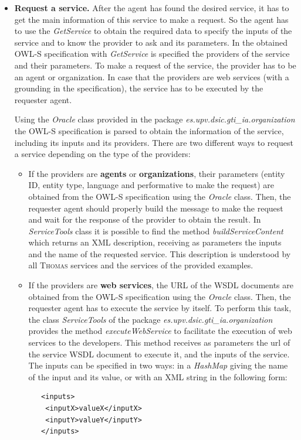 \begin{itemize}
\item \textbf{Request a service.} After the agent has found the desired service, it has to get the main information of this service to make a request. So the agent has to use the \textit{GetService} to obtain the required data to specify the inputs of the service and to know the provider to ask and its parameters. In the obtained OWL-S specification with \textit{GetService} is specified the providers of the service and their parameters. To make a request of the service, the provider has to be an agent or organization. In case that the providers are web services (with a grounding in the specification), the service has to be executed by the requester agent.

Using the \textit{Oracle} class provided in the package \textit{es.upv.dsic.gti\_ia.organization} the OWL-S specification is parsed to obtain the information of the service, including its inputs and its providers. There are two different ways to request a service depending on the type of the providers:
\begin{itemize}
 \item If the providers are \textbf{agents} or \textbf{organizations}, their parameters (entity ID, entity type, language and performative to make the request) are obtained from the OWL-S specification using the \textit{Oracle} class. Then, the requester agent should properly build the message to make the request and wait for the response of the provider to obtain the result. In \textit{ServiceTools} class it is possible to find the method \textit{buildServiceContent} which returns an XML description, receiving as parameters the inputs and the name of the requested service. This description is understood by all \textsc{Thomas} services and the services of the provided examples.

 \item If the providers are \textbf{web services}, the URL of the WSDL documents are obtained from the OWL-S specification using the \textit{Oracle} class. Then, the requester agent has to execute the service by itself. To perform this task, the class \textit{ServiceTools} of the package \textit{es.upv.dsic.gti\_ia.organization} provides the method \textit{executeWebService} to facilitate the execution of web services to the developers. This method receives as parameters  the url of the service WSDL document to execute it, and the inputs of the service. The inputs can be specified in two ways: in a \textit{HashMap} giving the name of the input and its value, or with an XML string in the following form:
  \begin{lstlisting}
   <inputs>
    <inputX>valueX</inputX>
    <inputY>valueY</inputY>
   </inputs>
  \end{lstlisting}
\end{itemize}

\end{itemize}

